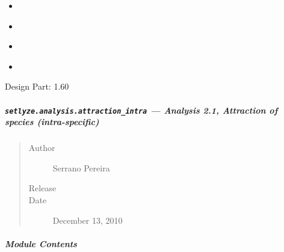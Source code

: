 \documentclass[letterpaper,10pt,english]{sphinxmanual}
\begin{document}
\begin{fulllineitems}
\begin{fulllineitems}
\begin{description}
\begin{itemize}
\begin{description}
\begin{itemize}
\end{itemize}

\end{description}

\item {} 
{\hyperref[setlyze/analysis/attraction_inter:setlyze.analysis.attraction_inter.Start.calculate_distances_inter]{}}

\item {} 
{\hyperref[setlyze/analysis/attraction_inter:setlyze.analysis.attraction_inter.Start.calculate_distances_inter_expected]{}}

\item {} 
{\hyperref[setlyze/analysis/attraction_inter:setlyze.analysis.attraction_inter.Start.calculate_significance]{}}

\item {} 
{\hyperref[setlyze/analysis/attraction_inter:setlyze.analysis.attraction_inter.Start.generate_report]{}}

\end{itemize}

\end{description}

Design Part: 1.60

\end{fulllineitems}


\end{fulllineitems}



\subparagraph{\texttt{setlyze.analysis.attraction\_intra} --- Analysis 2.1, Attraction of species (intra-specific)}
\label{setlyze/analysis/attraction_intra::doc}\label{setlyze/analysis/attraction_intra:setlyze-analysis-attraction-intra-analysis-2-1-attraction-of-species-intra-specific}\begin{quote}\begin{description}
\item[{Author}] \leavevmode
Serrano Pereira

\item[{Release}] 

\item[{Date}] \leavevmode
December 13, 2010

\end{description}\end{quote}


\subparagraph{Module Contents}
\label{setlyze/analysis/attraction_intra:module-contents}\label{setlyze/analysis/attraction_intra:module-setlyze.analysis.attraction_intra}
\end{document}
